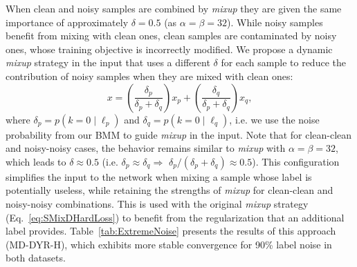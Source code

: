 \documentclass{article}
\begin{document}
When clean and noisy samples
are combined by \emph{mixup} they are given the same importance of approximately
$\delta=0.5$ (as $\alpha=\beta=32$). While noisy samples
benefit from mixing with clean ones, clean samples are contaminated by 
noisy ones, whose training objective is incorrectly modified.
We propose a dynamic \emph{mixup} strategy in the input
that uses a different $\delta$ for each sample to reduce the contribution
of noisy samples when they are mixed with clean ones: 
\begin{equation}
x=\left(\frac{\delta_{p}}{\delta_{p}+\delta_{q}}\right)x_{p}+\left(\frac{\delta_{q}}{\delta_{p}+\delta_{q}}\right)x_{q},
\end{equation}
where $\delta_{p}=p\!\left(k=0\mid\ell_{p}\right)$ and $\delta_{q}=p\!\left(k=0\mid\ell_{q}\right)$,
i.e. we use the noise probability from our BMM to guide \emph{mixup}
in the input. Note that for clean-clean and noisy-noisy cases, the behavior remains similar to \emph{mixup} with $\alpha=\beta=32$,
which leads to $\delta\approx0.5$ (i.e. $\delta_{p}\approx\delta_{q}\Rightarrow$
$\delta_{p}/(\delta_{p}+\delta_{q})\approx0.5$).
This configuration simplifies the input to the network when mixing a sample whose label is potentially useless, 
while retaining the strengths of \emph{mixup} for clean-clean and 
noisy-noisy combinations. This is used with the original \emph{mixup} strategy (Eq.~\eqref{eq:SMixDHardLoss})
to benefit from the regularization that an additional
label provides. Table~\ref{tab:ExtremeNoise} presents the results
of this approach (MD-DYR-H), which exhibits more stable convergence for 90\% 
label noise in both datasets.
\end{document}
